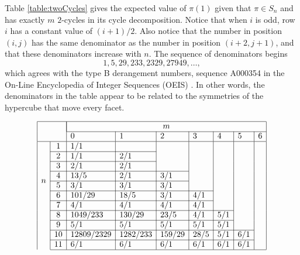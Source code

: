 Table \ref{table:twoCycles} gives the expected value of $\pi(1)$ given that
$\pi \in S_n$ and has exactly $m$ $2$-cycles in its cycle decomposition.
Notice that when $i$ is odd, row $i$ has a constant value of $(i+1)/2$. Also
notice that the number in position $(i,j)$ has the same denominator as the
number in position $(i+2, j+1)$, and that these denominators increase with $n$.
The sequence of denominators begins \begin{equation}
  1, 5, 29, 233, 2329, 27949, \dots,
\end{equation}
which agrees with the type B derangement numbers,
sequence A000354 in the On-Line Encyclopedia of Integer Sequences (OEIS) \cite{oeis}.
In other words, the denominators in the table appear to be related to
the symmetries of the hypercube that move every facet.
\begin{table}
  \begin{equation}
  \begin{array}{|ll|l|l|l|l|l|l|l|l|l|l|}
  \hline
  & & \multicolumn{7}{|c|}{m} \\ \cline{3-9}
  & & 0 & 1 & 2 & 3 & 4 & 5 & 6 \\ \hline
  \multirow{8}{*}{$n$}
  & \n{1}  & 1/1          &            &          &        &      &     &     \\ \cline{2-4}
  & \n{2}  & 1/1          & 2/1        &          &        &      &     &     \\ \cline{2-4}
  & \n{3}  & 2/1          & 2/1        &          &        &      &     &     \\ \cline{2-5}
  & \n{4}  & 13/5         & 2/1        & 3/1      &        &      &     &     \\ \cline{2-5}
  & \n{5}  & 3/1          & 3/1        & 3/1      &        &      &     &     \\ \cline{2-6}
  & \n{6}  & 101/29       & 18/5       & 3/1      & 4/1    &      &     &     \\ \cline{2-6}
  & \n{7}  & 4/1          & 4/1        & 4/1      & 4/1    &      &     &     \\ \cline{2-7}
  & \n{8}  & 1049/233     & 130/29     & 23/5     & 4/1    & 5/1  &     &     \\ \cline{2-7}
  & \n{9}  & 5/1          & 5/1        & 5/1      & 5/1    & 5/1  &     &     \\ \cline{2-8}
  & \n{10} & 12809/2329   & 1282/233   & 159/29   & 28/5   & 5/1  & 6/1 &     \\ \cline{2-8}
  & \n{11} & 6/1          & 6/1        & 6/1      & 6/1    & 6/1  & 6/1 &     \\ \cline{2-9}

\end{array}
\end{equation}
\end{table}
